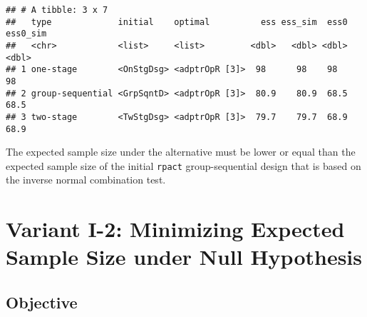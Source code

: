 \documentclass[
]{book}
\newenvironment{Shaded}{\begin{snugshade}}{\end{snugshade}}
\newcommand{\DecValTok}[1]{\textcolor[rgb]{0.00,0.00,0.81}{#1}}
\newcommand{\KeywordTok}[1]{\textcolor[rgb]{0.13,0.29,0.53}{\textbf{#1}}}
\newcommand{\NormalTok}[1]{#1}
\newcommand{\OperatorTok}[1]{\textcolor[rgb]{0.81,0.36,0.00}{\textbf{#1}}}
\newcommand{\StringTok}[1]{\textcolor[rgb]{0.31,0.60,0.02}{#1}}
\begin{document}
\begin{verbatim}
## # A tibble: 3 x 7
##   type             initial    optimal          ess ess_sim  ess0 ess0_sim
##   <chr>            <list>     <list>         <dbl>   <dbl> <dbl>    <dbl>
## 1 one-stage        <OnStgDsg> <adptrOpR [3]>  98      98    98       98  
## 2 group-sequential <GrpSqntD> <adptrOpR [3]>  80.9    80.9  68.5     68.5
## 3 two-stage        <TwStgDsg> <adptrOpR [3]>  79.7    79.7  68.9     68.9
\end{verbatim}

The expected sample size under the alternative must be lower or equal than
the expected sample size of the initial \texttt{rpact} group-sequential design that
is based on the inverse normal combination test.

\begin{Shaded}
\end{Shaded}

\hypertarget{variantI_2}{%
\section{Variant I-2: Minimizing Expected Sample Size under Null Hypothesis}\label{variantI_2}}

\hypertarget{objective-1}{%
\subsection{Objective}\label{objective-1}}
\end{document}
